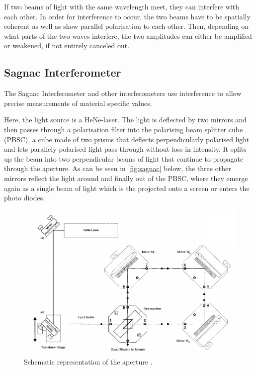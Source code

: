 If two beams of light with the same wavelength meet, they can interfere with each other.
In order for interference to occur, the two beams have to be spatially coherent as well as show parallel polarisation to each other.
Then, depending on what parts of the two waves interfere, the two amplitudes can either be amplified or weakened, if not entirely canceled out.


\subsection{Sagnac Interferometer}
\label{subsec:sagnacinterferometer}

The Sagnac Interferometer and other interferometers use interference to allow precise measurements of material specific values.

Here, the light source is a HeNe-laser.
The light is deflected by two mirrors and then passes through a polarisation filter into the polarising beam splitter cube (PBSC), 
a cube made of two prisms that deflects perpendicularly polarised light and lets parallely polarised light pass through without loss in intensity.
It splits up the beam into two perpendicular beams of light that continue to propagate through the aperture.
As can be seen in \autoref{fig:sagnac} below, the three other mirrors reflect the light around and finally out of the PBSC, 
where they emerge again as a single beam of light which is the projected onto a screen or enters the photo diodes.

\begin{figure}[H]
    \centering
    \includegraphics[width=\textwidth]{figures/V64_aufbau.pdf}
    \caption{Schematic representation of the aperture \cite{v64}.}
    \label{fig:sagnac}
\end{figure}

